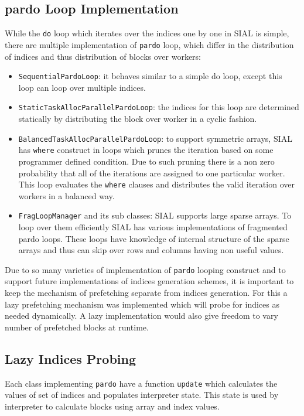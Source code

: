 \subsection{pardo Loop Implementation}
While the \texttt{do} loop which iterates over the indices one by one in SIAL is
simple, there are multiple implementation of \texttt{pardo} loop, which differ
in the distribution of indices and thus distribution of blocks over workers:
\begin{itemize}
\item \texttt{SequentialPardoLoop}: it behaves similar to a simple do loop,
  except this loop can loop over multiple indices.
\item \texttt{StaticTaskAllocParallelPardoLoop}: the indices for this loop are
  determined statically by distributing the block over worker in a cyclic fashion.
\item \texttt{BalancedTaskAllocParallelPardoLoop}: to support symmetric arrays,
  SIAL has \texttt{where} construct in loops which prunes the iteration based on
  some programmer defined condition. Due to such pruning there is a non zero
  probability that all of the iterations are assigned to one particular worker.
  This loop evaluates the \texttt{where} clauses and distributes the valid iteration
  over workers in a balanced way.
\item \texttt{FragLoopManager} and its sub classes: SIAL supports large sparse
  arrays. To loop over them efficiently SIAL has various implementations of
  fragmented pardo loops. These loops have knowledge of internal structure of the
  sparse arrays and thus can skip over rows and columns having non useful values.
\end{itemize}
Due to so many varieties of implementation of \texttt{pardo} looping construct
and to support future implementations of indices generation schemes, it is
important to keep the mechanism of prefetching separate from indices generation.
For this a lazy prefetching mechanism was implemented which will probe for indices
as needed dynamically. A lazy implementation would also give freedom to vary number
of prefetched blocks at runtime.

\subsection{Lazy Indices Probing}
Each class implementing \texttt{pardo} have a function \texttt{update} which
calculates the values of set of indices and populates interpreter state. This
state is used by interpreter to calculate blocks using array and index values.

